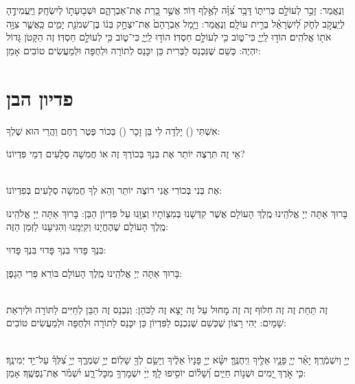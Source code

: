 \documentclass[twoside, openany, parskip=half, 11pt]{book}
\begin{document}
 
וְנֶאֱמַר: זָכַ֣ר  לְעוֹלָ֣ם בְּרִית֑וֹ דָּבָ֥ר צִ֝וָּ֗ה לְאֶ֣לֶף דּֽוֹר׃ אֲשֶׁ֣ר כָּ֭רַת אֶת־אַבְרָהָ֑ם 
וּשְׁב֖וּעָת֣וֹ לְיִשְׂחָֽק׃ וַיַּֽעֲמִידֶ֣הָ לְיַֽעֲקֹ֣ב לְחֹ֑ק לְ֝יִשְׂרָאֵ֗ל בְּרִ֣ית עוֹלָֽם׃
 וְנֶאֱמַר:  וַיָּ֤מָל אַבְרָהָם֙ אֶת־יִצְחָ֣ק בְּנ֔וֹ בֶּן־שְׁמֹנַ֖ת יָמִ֑ים כַּֽאֲשֶׁ֛ר צִוָּ֥ה אֹת֖וֹ אֱלֹהִֽים׃
 הוֹד֣וּ לַֽיְיָ֑ כִּי־ט֑וֹב כִּ֖י לְעוֹלָ֣ם חַסְדּֽוֹ׃ 
 הוֹד֣וּ לַֽיְיָ֑ כִּי־ט֑וֹב כִּ֖י לְעוֹלָ֣ם חַסְדּֽוֹ׃
 זֶה הַקָּטֹן גָּדוֹל יִהְיֶה: 
כְּשֵׁם שֶׁנִּכְנַס לַבְּרִית  כֵּן יִכָּנֵס לְתוֹרָה  וּלְחֻפָּה  וּלְמַעֲשִׂים טוֹבִים  אָמֵן:

\vfill
\sepline

\chapter[פדיון הבן]{ פדיון הבן }


אִשְׁתִּי () יָלְדָה לִי בֵּן זָכָר ()  בְּכוֹר  פֶּטֶר רֶחֶם  וַהֲרֵי הוּא שֶׁלְךָ:

אֵי זֶה תִּרְצֶה יוֹתֵר  אֶת בִּנְךָ בְּכוֹרֶךָ זֶה  אוֹ חֲמִשָׁה סְלָעִים דְמֵי פִּדְיוֹנוֹ?

\\
אֶת בְּנִי בְּכוֹרִי אֲנִי רוֹצֶה יוֹתֵר  וְהֵא לְךָ חֲמִשָׁה סְלָעִים בְּפִדְיוֹנוֹ:

בָּרוּךְ אַתָּה יְיָ אֱלֹהֵֽינוּ מֶֽלֶךְ הָעוֹלָם  אֲשֶׁר קִדְּשָׁנוּ בְּמִצְוֹתָיו  וְצִוָּֽנוּ עַל פִּדְיוֹן הַבֵּן:
בָּרוּךְ אַתָּה יְיָ אֱלֹהֵֽינוּ מֶֽלֶךְ הָעוֹלָם  שֶׁהֶחֱיָנוּ וְקִיְּמָֽנוּ וְהִגִּיעָנוּ לַזְּמַן הַזֶּה:


בִּנְךָ פָּדוּי  בִּנְךָ פָּדוּי  בִּנְךָ פָּדוּי:

בָּרוּךְ אַתָּה יְיָ אֱלֹהֵֽינוּ מֶֽלֶךְ הָעוֹלָם  בּוֹרֵא פְּרִי הַגָפֶן:

 \\
זֶה תַּחַת זֶה  זֶה חִלוּף זֶה  זֶה מָחוּל עַל זֶה  יָצָא זֶה לַכֹּהֵן: 
וְנִכְנַס זֶה הַבֵּן לְחַיִּים  לַתּוֹרָה וּלְיִרְאַת שָׁמָיִם: 
יְהִי רָצוֹן שֶׁכְּשֵׁם שֶׁנִכְנַס לַפִּדְיוֹן כֵּן יִכָּנֵס לַתוֹרָה וּלְחֻפָּה וּלְמַעֲשִׂים טוֹבִים:

\\
	 יְיָ֖ 	וְיִשְׁמְֿרֶֽךָ׃ יָאֵ֨ר יְיָ֧ פָּנָ֛יו אֵלֶ֖יךָ וִֽיחֻנֶּֽךָּ׃ יִשָּׂ֨א יְיָ֤ פָּנָיו֙ אֵלֶ֔יךָ וְיָשֵׂ֥ם לְךָ֖ שָׁלֽוֹם׃
 יְיָ֥  שֹֽׁמְרֶ֑ךָ יְיָ֥ צִ֝לְּךָ֗ עַל־יַ֥ד יְמִינֶֽךָ׃ 
כִּ֤י אֹ֣רֶךְ  יָ֭מִים וּשְׁנ֣וֹת חַיִּ֑ים וְ֝שָׁל֗וֹם יוֹסִ֥יפוּ לָֽךְ׃ 
יְיָׄ  יִשְׁמָרְךָ֥ מִכָּל־רָ֑ע יִ֝שְׁמֹ֗ר אֶת־נַפְשֶֽׁךָ׃ אָמֵן:
\end{document}
